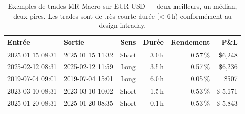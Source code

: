 \begin{table}[H]
\centering
\caption{Exemples de trades MR Macro sur EUR-USD — deux meilleurs, un médian, deux pires. Les trades sont de très courte durée (< 6\,h) conformément au design intraday.}
\label{tab:trades_mr_macro}
\begin{tabular}{llcrrr}
\toprule
Entrée & Sortie & Sens & Durée & Rendement & P\&L \\
\midrule
2025-01-15 08:31 & 2025-01-15 11:32 & Short & 3.0\,h & 0.57\,\% & \$6,248 \\
2025-02-12 08:31 & 2025-02-12 11:59 & Long & 3.5\,h & 0.57\,\% & \$6,236 \\
2019-07-04 09:01 & 2019-07-04 15:01 & Long & 6.0\,h & 0.05\,\% & \$507 \\
2023-03-10 08:31 & 2023-03-10 10:02 & Short & 1.5\,h & -0.53\,\% & \$-5,671 \\
2025-01-20 08:31 & 2025-01-20 08:35 & Short & 0.1\,h & -0.53\,\% & \$-5,843 \\
\bottomrule
\end{tabular}
\end{table}
